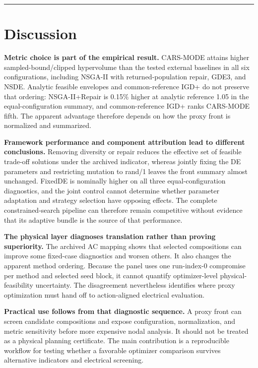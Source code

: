 \documentclass[energies,article,submit,moreauthors]{Definitions/mdpi}
\begin{document}
\begin{center}\rule{0.5\linewidth}{0.5pt}\end{center}

\section{Discussion}\label{discussion}

\textbf{Metric choice is part of the empirical result.} CARS-MODE attains higher sampled-bound/clipped hypervolume than the tested external baselines in all six configurations, including NSGA-II with returned-population repair, GDE3, and NSDE. Analytic feasible envelopes and common-reference IGD+ do not preserve that ordering: NSGA-II+Repair is 0.15\% higher at analytic reference 1.05 in the equal-configuration summary, and common-reference IGD+ ranks CARS-MODE fifth. The apparent advantage therefore depends on how the proxy front is normalized and summarized.

\textbf{Framework performance and component attribution lead to different conclusions.} Removing diversity or repair reduces the effective set of feasible trade-off solutions under the archived indicator, whereas jointly fixing the DE parameters and restricting mutation to rand/1 leaves the front summary almost unchanged. FixedDE is nominally higher on all three equal-configuration diagnostics, and the joint control cannot determine whether parameter adaptation and strategy selection have opposing effects. The complete constrained-search pipeline can therefore remain competitive without evidence that its adaptive bundle is the source of that performance.

\textbf{The physical layer diagnoses translation rather than proving superiority.} The archived AC mapping shows that selected compositions can improve some fixed-case diagnostics and worsen others. It also changes the apparent method ordering. Because the panel uses one run-index-0 compromise per method and selected seed block, it cannot quantify optimizer-level physical-feasibility uncertainty. The disagreement nevertheless identifies where proxy optimization must hand off to action-aligned electrical evaluation.

\textbf{Practical use follows from that diagnostic sequence.} A proxy front can screen candidate compositions and expose configuration, normalization, and metric sensitivity before more expensive nodal analysis. It should not be treated as a physical planning certificate. The main contribution is a reproducible workflow for testing whether a favorable optimizer comparison survives alternative indicators and electrical screening.
\end{document}

